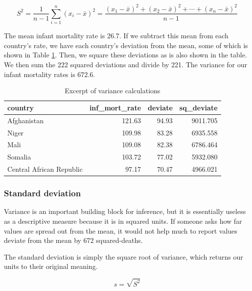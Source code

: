\documentclass[
]{book}
\begin{document}
\begin{equation}
{\displaystyle S^2={\frac {1}{n-1}}\sum _{i=1}^{n}(x_{i}-\bar{x})^2={\frac {(x_{1}-\bar{x})^2+(x_{2}-\bar{x})^2+\cdots +(x_{n}-\bar{x})^2}{n-1}}}
\label{eq:variance}
\end{equation}

The mean infant mortality rate is 26.7. If we subtract this mean from each country's rate, we have each country's deviation from the mean, some of which is shown in Table \ref{tab:varcalcs}. Then, we square these deviations as is also shown in the table. We then sum the 222 squared deviations and divide by 221. The variance for our infant mortality rates is 672.6.

\begin{table}

\caption{\label{tab:varcalcs}Excerpt of variance calculations}
\centering
\begin{tabular}[t]{l|r|r|r}
\hline
country & inf\_mort\_rate & deviate & sq\_deviate\\
\hline
Afghanistan & 121.63 & 94.93 & 9011.705\\
\hline
Niger & 109.98 & 83.28 & 6935.558\\
\hline
Mali & 109.08 & 82.38 & 6786.464\\
\hline
Somalia & 103.72 & 77.02 & 5932.080\\
\hline
Central African Republic & 97.17 & 70.47 & 4966.021\\
\hline
\end{tabular}
\end{table}

\hypertarget{standard-deviation}{%
\subsubsection*{Standard deviation}\label{standard-deviation}}

Variance is an important building block for inference, but it is essentially useless as a descriptive measure because it is in squared units. If someone asks how far values are spread out from the mean, it would not help much to report values deviate from the mean by 672 squared-deaths.

The standard deviation is simply the square root of variance, which returns our units to their original meaning.

\begin{equation}
{\displaystyle s = \sqrt{S^2}}
\label{eq:sd}
\end{equation}
\end{document}

